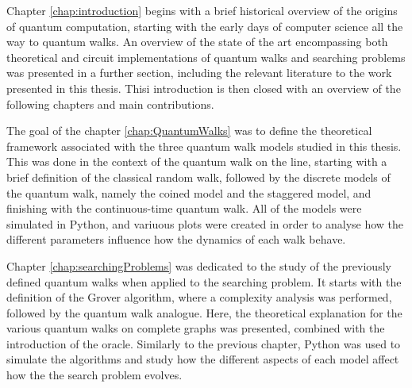 \documentclass[../../dissertation.tex]{subfiles}
\begin{document}
Chapter \ref{chap:introduction} begins with a brief historical overview of the
origins of quantum computation, starting with the early days of computer
science all the way to quantum walks. An overview of the state of the art
encompassing both theoretical and circuit implementations of quantum walks and
searching problems was presented in a further section, including the relevant
literature to the work presented in this thesis. Thisi introduction is then
closed with an overview of the following chapters and main contributions.\par

The goal of the chapter \ref{chap:QuantumWalks} was to define the theoretical
framework associated with the three quantum walk models studied in this thesis.
This was done in the context of the quantum walk on the line, starting with a
brief definition of the classical random walk, followed by the discrete models
of the quantum walk, namely the coined model and the staggered model, and
finishing with the continuous-time quantum walk. All of the models were
simulated in Python, and variuous plots were created in order to analyse how
the different parameters influence how the dynamics of each walk behave.\par

Chapter \ref{chap:searchingProblems} was dedicated to the study of the
previously defined quantum walks when applied to the searching problem. It
starts with the definition of the Grover algorithm, where a complexity analysis
was performed, followed by the quantum walk analogue. Here, the theoretical
explanation for the various quantum walks on complete graphs was presented,
combined with the introduction of the oracle. Similarly to the previous
chapter, Python was used to simulate the algorithms and study how the different
aspects of each model affect how the the search problem evolves.\par
\end{document}
